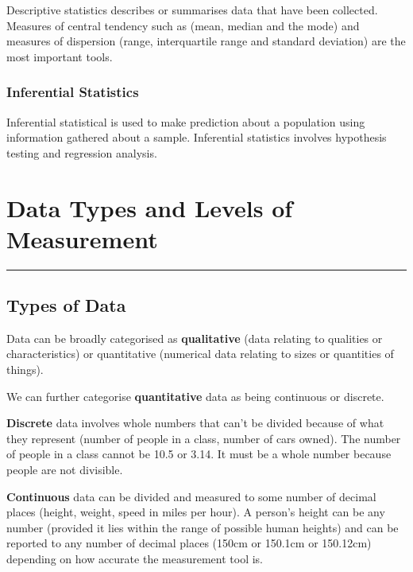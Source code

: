 \documentclass[
]{book}
\begin{document}
Descriptive statistics describes or summarises data that have been collected. Measures of central tendency such as (mean, median and the mode) and measures of dispersion (range, interquartile range and standard deviation) are the most important tools.

\hypertarget{inferential-statistics}{%
\subsection{Inferential Statistics}\label{inferential-statistics}}

Inferential statistical is used to make prediction about a population using information gathered about a sample. Inferential statistics involves hypothesis testing and regression analysis.

\hypertarget{data-types-and-levels-of-measurement}{%
\chapter{Data Types and Levels of Measurement}\label{data-types-and-levels-of-measurement}}

\begin{center}\rule{0.5\linewidth}{0.5pt}\end{center}

\hypertarget{types-of-data}{%
\section{Types of Data}\label{types-of-data}}

Data can be broadly categorised as \textbf{qualitative} (data relating to qualities or characteristics) or quantitative (numerical data relating to sizes or quantities of things).

We can further categorise \textbf{quantitative} data as being continuous or discrete.

\textbf{Discrete} data involves whole numbers that can't be divided because of what they represent (number of people in a class, number of cars owned). The number of people in a class cannot be 10.5 or 3.14. It must be a whole number because people are not divisible.

\textbf{Continuous} data can be divided and measured to some number of decimal places (height, weight, speed in miles per hour). A person's height can be any number (provided it lies within the range of possible human heights) and can be reported to any number of decimal places (150cm or 150.1cm or 150.12cm) depending on how accurate the measurement tool is.
\end{document}
